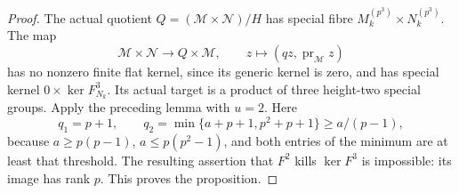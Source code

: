 \begin{proof}
The actual quotient \(Q=(\mathcal M\times\mathcal N)/H\)
has special fibre \(M_k^{(p^3)}\times N_k^{(p^3)}\).
The map
\[
 \mathcal M\times\mathcal N\longrightarrow Q\times\mathcal M,
 \qquad z\longmapsto(qz,\operatorname{pr}_{\mathcal M}z)
                                                        \tag{B-RD77.7}
\]
has no nonzero finite flat kernel, since its generic kernel is
zero, and has special kernel \(0\times\ker F_{N_k}^{3}\).
Its actual target is a product of three height-two special
groups. Apply the preceding lemma with \(u=2\). Here
\[
 q_1=p+1,\qquad
 q_2=\min\{a+p+1,p^2+p+1\}\ge a/(p-1),              \tag{B-RD77.8}
\]
because \(a\ge p(p-1)\), \(a\le p(p^2-1)\), and both
entries of the minimum are at least that threshold. The
resulting assertion that \(F^2\) kills \(\ker F^3\) is
impossible: its image has rank \(p\). This proves the proposition.
\end{proof}


